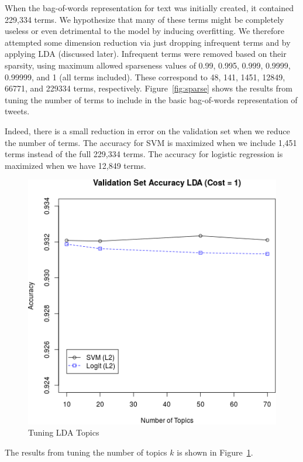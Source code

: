 \documentclass{sig-alternate-05-2015}
\begin{document}
When the bag-of-words representation for text was initially created, it contained 229,334 terms. We hypothesize that many of these terms might be completely useless or even detrimental to the model by inducing overfitting. We therefore attempted some dimension reduction via just dropping infrequent terms and by applying LDA (discussed later). Infrequent terms were removed based on their sparsity, using maximum allowed sparseness values of 0.99, 0.995, 0.999, 0.9999, 0.99999, and 1 (all terms included). These correspond to 48, 141, 1451, 12849, 66771, and 229334 terms, respectively. Figure~\ref{fig:sparse} shows the results from tuning the number of terms to include in the basic bag-of-words representation of tweets. 

Indeed, there is a small reduction in error on the validation set when we reduce the number of terms. The accuracy for SVM is maximized when we include 1,451 terms instead of the full 229,334 terms. The accuracy for logistic regression is maximized when we have 12,849 terms.

\begin{figure}
  \centering
  \includegraphics[scale=0.5]{valid_k.png}
  \caption{Tuning LDA Topics}
  \label{fig:LDA}
\end{figure}
The results from tuning the number of topics $k$ is shown in Figure~\ref{fig:LDA}.
\end{document}
